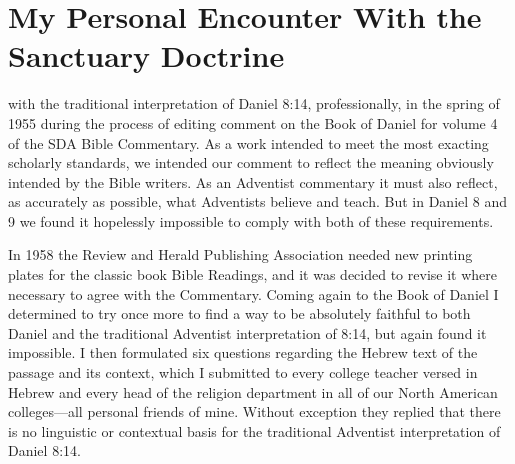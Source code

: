 \chapter{My Personal Encounter With the Sanctuary Doctrine}
\label{ch:personal}

 with the traditional interpretation of Daniel
8:14, professionally, in the spring of 1955 during the process of editing
comment on the Book of Daniel for volume 4 of the SDA Bible Commentary. As
a work intended to meet the most exacting scholarly standards, we intended
our comment to reflect the meaning obviously intended by the Bible writers.
As an Adventist commentary it must also reflect, as accurately as possible,
what Adventists believe and teach. But in Daniel 8 and 9 we found it
hopelessly impossible to comply with both of these requirements.

In 1958 the Review and Herald Publishing Association needed new printing
plates for the classic book Bible Readings, and it was decided to revise it
where necessary to agree with the Commentary. Coming again to the Book of
Daniel I determined to try once more to find a way to be absolutely faithful
to both Daniel and the traditional Adventist interpretation of 8:14, but
again found it impossible. I then formulated six questions regarding the
Hebrew text of the passage and its context, which I submitted to every
college teacher versed in Hebrew and every head of the religion department 
in all of our North American colleges---all personal friends of mine.
Without exception they replied that there is no linguistic or contextual
basis for the traditional Adventist interpretation of Daniel 8:14.

